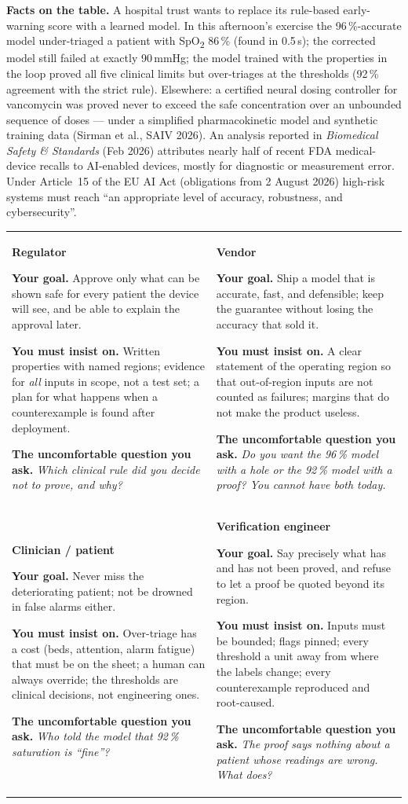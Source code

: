 \documentclass[11pt]{article}
\newcommand{\rolecard}[4]{%
\begin{tcolorbox}[enhanced,colback=white,colframe=bpInk,boxrule=0.6pt,arc=0pt,left=2mm,right=2mm,top=1.5mm,bottom=1.5mm,height=6.1cm,fontupper=\footnotesize,borderline={0.4pt}{-1.4mm}{bpRule,dashed},
  overlay={\node[anchor=north east,inner sep=1.2mm,font=\bpmono\tiny,text=bpGraphite] at (frame.north east) {ROLE CARD \quad \faCut\ CUT ALONG THE DASHED LINE};}]
{\bpdisplay\bfseries\normalsize\color{bpInk}#1\par}\vspace{1mm}
\textbf{Your goal.} #2\par\vspace{1mm}
\textbf{You must insist on.} #3\par\vspace{1mm}
\textbf{The uncomfortable question you ask.} \emph{#4}
\end{tcolorbox}}
\begin{document}
\begin{notebox}\footnotesize
\textbf{Facts on the table.} A hospital trust wants to replace its rule-based early-warning score with a learned model. In this afternoon's exercise the 96\,\%-accurate model under-triaged a patient with SpO\textsubscript{2} 86\,\% (found in 0.5\,s); the corrected model still failed at exactly 90\,mmHg; the model trained with the properties in the loop proved all five clinical limits but over-triages at the thresholds (92\,\% agreement with the strict rule). Elsewhere: a certified neural dosing controller for vancomycin was proved never to exceed the safe concentration over an unbounded sequence of doses — under a simplified pharmacokinetic model and synthetic training data (Sirman et al., SAIV 2026). An analysis reported in \emph{Biomedical Safety \& Standards} (Feb 2026) attributes nearly half of recent FDA medical-device recalls to AI-enabled devices, mostly for diagnostic or measurement error. Under Article~15 of the EU AI Act (obligations from 2 August 2026) high-risk systems must reach ``an appropriate level of accuracy, robustness, and cybersecurity''.
\end{notebox}
\begin{tabularx}{\textwidth}{@{}XX@{}}
\rolecard{Regulator}{Approve only what can be shown safe for every patient the device will see, and be able to explain the approval later.}{Written properties with named regions; evidence for \emph{all} inputs in scope, not a test set; a plan for what happens when a counterexample is found after deployment.}{Which clinical rule did you decide not to prove, and why?} &
\rolecard{Vendor}{Ship a model that is accurate, fast, and defensible; keep the guarantee without losing the accuracy that sold it.}{A clear statement of the operating region so that out-of-region inputs are not counted as failures; margins that do not make the product useless.}{Do you want the 96\,\% model with a hole or the 92\,\% model with a proof? You cannot have both today.}\\[4mm]
\rolecard{Clinician / patient}{Never miss the deteriorating patient; not be drowned in false alarms either.}{Over-triage has a cost (beds, attention, alarm fatigue) that must be on the sheet; a human can always override; the thresholds are clinical decisions, not engineering ones.}{Who told the model that 92\,\% saturation is ``fine''?} &
\rolecard{Verification engineer}{Say precisely what has and has not been proved, and refuse to let a proof be quoted beyond its region.}{Inputs must be bounded; flags pinned; every threshold a unit away from where the labels change; every counterexample reproduced and root-caused.}{The proof says nothing about a patient whose readings are wrong. What does?}\\
\end{tabularx}
\end{document}
